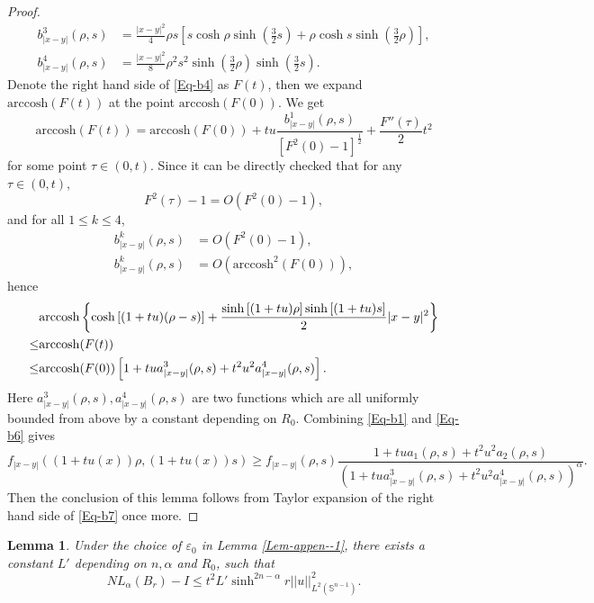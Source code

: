 \documentclass[11pt,reqno]{amsart}
\newtheorem{lem}[thm]{Lemma}
\theoremstyle{definition}
\theoremstyle{remark}
\numberwithin{equation}{section}
\renewcommand{\(}{\left(}
\renewcommand{\)}{\right)}
\renewcommand{\-}{\overline}
\begin{document}
\begin{proof}
\begin{align*}
		b^3_{|x-y|}(\rho,s)&=\frac{|x-y|^2}{4}\rho s\left[s\cosh\rho\sinh\left(\frac{3}{2}s\right)+\rho\cosh s\sinh\left(\frac{3}{2}\rho\right)\right],\\
		b^4_{|x-y|}(\rho,s)&=\frac{|x-y|^2}{8}\rho^2 s^2\sinh\left(\frac{3}{2}\rho\right)\sinh\left(\frac{3}{2}s\right).
	\end{align*} 
	Denote the right hand side of \eqref{Eq-b4} as $F(t)$, then we expand $\mathrm{arccosh}(F(t))$ at the point $\mathrm{arccosh}(F(0))$. We get
	\begin{equation}\label{Eq-b5}
		\mathrm{arccosh}(F(t))=\mathrm{arccosh}(F(0))+tu\frac{b^1_{|x-y|}(\rho,s)}{\left[F^2(0)-1\right]^{\frac{1}{2}}}+\frac{F''(\tau)}{2}t^2
	\end{equation}
	for some point $\tau\in(0,t)$. Since it can be directly checked that for any $\tau\in(0,t)$,
	\begin{equation*}
		F^2(\tau)-1=O(F^2(0)-1),
	\end{equation*}
	and for all $1\leq k\leq 4$, 
	\begin{align*}
		b^k_{|x-y|}(\rho,s)&=O(F^2(0)-1),\\
		b^k_{|x-y|}(\rho,s)&=O(\mathrm{arccosh}^2(F(0))),
	\end{align*}
 hence
	\begin{align}
		&\mathrm{arccosh}\left\{\cosh\left[(1+tu)(\rho-s)\right]+\frac{\sinh\left[(1+tu)\rho\right]	\sinh\left[(1+tu)s\right]}{2}|x-y|^2\right\}\notag\\
		\leq&\mathrm{arccosh}(F(t))\notag\\
		\leq&\mathrm{arccosh}(F(0))\left[1+tu a^3_{|x-y|}(\rho,s)+t^2u^2a^4_{|x-y|}(\rho,s)\right].\label{Eq-b6}
	\end{align}
	Here $a^3_{|x-y|}(\rho,s), a^4_{|x-y|}(\rho,s)$ are two functions which are all uniformly bounded from above by a constant depending on $R_0$. Combining \eqref{Eq-b1} and \eqref{Eq-b6} gives
	\begin{equation}\label{Eq-b7}
			f_{|x-y|}\left((1+tu(x))\rho,(1+tu(x))s\right)\geq f_{|x-y|}(\rho,s)\frac{1+tu a_1(\rho,s)+t^2u^2a_2(\rho,s)}{\left(1+tu a^3_{|x-y|}(\rho,s)+t^2u^2a^4_{|x-y|}(\rho,s)\right)^{\alpha}}.
	\end{equation}
	Then the conclusion of this lemma follows from Taylor expansion of the right hand side of \eqref{Eq-b7} once more.
\end{proof}
\begin{lem}\label{Lem-appen_0}
	Under the choice of $\varepsilon_0$ in Lemma \ref{Lem-appen--1}, there exists a constant $L'$ depending on $n,\alpha$ and $R_0$, such that 
	\begin{equation}
		NL_{\alpha}(B_r)-I\leq t^2L'\sinh^{2n-\alpha} r||u||^2_{L^2(\mathbb{S}^{n-1})}.
	\end{equation}
\end{lem}
\end{document}
